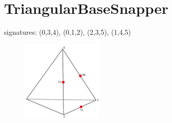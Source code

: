 \documentclass{article}
\begin{document}
\begin{figure}
\end{figure}

\setcounter{subfigure}{0}
\clearpage




\section{TriangularBaseSnapper}

signatures: (0,3,4), (0,1,2), (2,3,5), (1,4,5)

\begin{figure}[h!]
\includegraphics[width=4cm]{TriangularBaseSnapper}
\end{figure}
\end{document}
